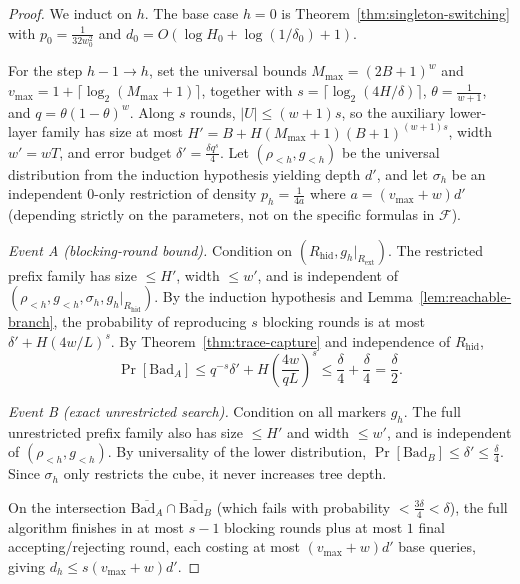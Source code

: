 \documentclass[11pt,a4paper]{article}
\theoremstyle{definition}
\theoremstyle{remark}
\newcommand{\Prb}{\Pr}
\begin{document}
\begin{proof}
We induct on $h$. The base case $h = 0$ is Theorem~\ref{thm:singleton-switching} with $p_0 = \frac{1}{32w_0^2}$ and $d_0 = O(\log H_0 + \log(1/\delta_0) + 1)$.

For the step $h-1 \to h$, set the universal bounds $M_{\max} = (2B+1)^w$ and $v_{\max} = 1 + \lceil \log_2(M_{\max}+1) \rceil$, together with $s = \lceil \log_2(4H/\delta)\rceil$, $\theta = \frac{1}{w+1}$, and $q = \theta(1-\theta)^w$. Along $s$ rounds, $|U| \le (w+1)s$, so the auxiliary lower-layer family has size at most $H' = B + H(M_{\max}+1)(B+1)^{(w+1)s}$, width $w' = wT$, and error budget $\delta' = \frac{\delta q^s}{4}$. Let $(\rho_{<h}, g_{<h})$ be the universal distribution from the induction hypothesis yielding depth $d'$, and let $\sigma_h$ be an independent $0$-only restriction of density $p_h = \frac{1}{4a}$ where $a = (v_{\max} + w)d'$ (depending strictly on the parameters, not on the specific formulas in $\mathcal{F}$).

\emph{Event A (blocking-round bound).} Condition on $(R_{\mathrm{hid}}, g_h|_{R_{\mathrm{ext}}})$. The restricted prefix family has size $\le H'$, width $\le w'$, and is independent of $(\rho_{<h}, g_{<h}, \sigma_h, g_h|_{R_{\mathrm{hid}}})$. By the induction hypothesis and Lemma~\ref{lem:reachable-branch}, the probability of reproducing $s$ blocking rounds is at most $\delta' + H(4w/L)^s$. By Theorem~\ref{thm:trace-capture} and independence of $R_{\mathrm{hid}}$,
\[
  \Prb[\mathrm{Bad}_A] \le q^{-s}\delta' + H\left(\frac{4w}{qL}\right)^s \le \frac{\delta}{4} + \frac{\delta}{4} = \frac{\delta}{2}.
\]

\emph{Event B (exact unrestricted search).} Condition on all markers $g_h$. The full unrestricted prefix family also has size $\le H'$ and width $\le w'$, and is independent of $(\rho_{<h}, g_{<h})$. By universality of the lower distribution, $\Prb[\mathrm{Bad}_B] \le \delta' \le \frac{\delta}{4}$. Since $\sigma_h$ only restricts the cube, it never increases tree depth.

On the intersection $\overline{\mathrm{Bad}_A} \cap \overline{\mathrm{Bad}_B}$ (which fails with probability $< \frac{3\delta}{4} < \delta$), the full algorithm finishes in at most $s - 1$ blocking rounds plus at most $1$ final accepting/rejecting round, each costing at most $(v_{\max} + w)d'$ base queries, giving $d_h \le s(v_{\max} + w)d'$.
\end{proof}
\end{document}
